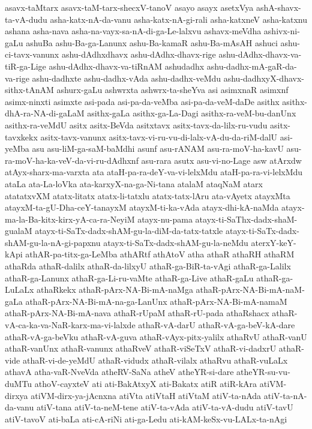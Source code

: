{asavx-taMtarx
asavx-taM-tarx-shecxV-tanoV
asayo
asayx
asetxVya
ashA-shavx-ta-vA-dudu
asha-katx-nA-da-vanu
asha-katx-nA-gi-rali
asha-katxneV
asha-katxnu
ashana
asha-nava
asha-na-vayx-sa-nA-di-ga-Le-lalxvu
ashavx-meVdha
ashivx-ni-gaLu
ashuBa
ashu-Ba-ga-Lanunx
ashu-Ba-kamaR
ashu-Ba-mAsAH
ashuci
ashu-ci-tavx-vanunx
ashu-dAdhxdhavx
ashu-dAdhx-dhavx-rige
ashu-dAdhx-dhavx-va-tiR-ga-Lige
ashu-dAdhx-dhavx-va-tiRnAM
ashudadhx
ashu-dadhx-mA-gaR-da-va-rige
ashu-dadhxte
ashu-dadhx-vAda
ashu-dadhx-veMdu
ashu-dadhxyX-dhavx-sithx-tAnAM
ashurx-gaLu
ashwrxta
ashwrx-ta-sheYva
asi
asimxnaR
asimxnf
asimx-ninxti
asimxte
asi-pada
asi-pa-da-veMba
asi-pa-da-veM-daDe
asithx
asithx-dhA-ra-NA-di-gaLaM
asithx-gaLa
asithx-ga-La-Dagi
asithx-ra-veM-bu-danUnx
asithx-ra-veMdU
asitx
asitx-BeVda
asitxtavx
asitx-tavx-da-lilx-ru-vudu
asitx-tavxkekx
asitx-tavx-vanunx
asitx-tavx-vi-ru-vu-di-lalx-vA-du-da-riM-dalU
asi-yeMba
asu
asu-liM-ga-saM-baMdhi
asunf
asu-rANAM
asu-ra-moV-ha-kavU
asu-ra-moV-ha-ka-veV-da-vi-ru-dAdhxnf
asu-rara
asutx
asu-vi-no-Lage
asw
atArxdw
atAyx-sharx-ma-varxta
ata
ataH-pa-ra-deY-va-vi-lelxMdu
ataH-pa-ra-vi-lelxMdu
ataLa
ata-La-loVka
ata-karxyX-na-ga-Ni-tana
atalaM
ataqNaM
atarx
atatatxvXM
atatx-litatx
atatx-li-tatxlu
atatx-tatx-lAru
ata-vAyetx
atayxMta
atayxM-ta-gU-Dha-ceY-tanayxM
atayxM-ti-ka-vAda
atayx-dhi-kA-naMda
atayx-ma-la-Ba-kitx-kirx-yA-ca-ra-NeyiM
atayx-nu-pama
atayx-ti-SaThx-dadx-shaM-gualaM
atayx-ti-SaTx-dadx-shAM-gu-la-diM-da-tatx-tatxle
atayx-ti-SaTx-dadx-shAM-gu-la-nA-gi-papxnu
atayx-ti-SaTx-dadx-shAM-gu-la-neMdu
aterxY-keY-kApi
athAR-pa-titx-ga-LeMba
athARtf
athAtoV
atha
athaR
athaRH
athaRM
athaRda
athaR-dalilx
athaR-da-lilxyU
athaR-ga-BiR-ta-vAgi
athaR-ga-Lalilx
athaR-ga-Lanunx
athaR-ga-Li-ru-vaMte
athaR-ga-Live
athaR-gaLu
athaR-ga-LuLaLx
athaRkekx
athaR-pArx-NA-Bi-mA-naMga
athaR-pArx-NA-Bi-mA-naM-gaLa
athaR-pArx-NA-Bi-mA-na-ga-LanUnx
athaR-pArx-NA-Bi-mA-namaM
athaR-pArx-NA-Bi-mA-nava
athaR-rUpaM
athaR-rU-pada
athaRshacx
athaR-vA-ca-ka-va-NaR-karx-ma-vi-lalxde
athaR-vA-darU
athaR-vA-ga-beV-kA-dare
athaR-vA-ga-beVku
athaR-vA-guva
athaR-vAyx-pitx-yalilx
athaRvU
athaR-vanU
athaR-vanUnx
athaR-vanunx
athaRveV
athaR-viSeTxV
athaR-vi-dadxrU
athaR-vide
athaR-vi-de-yeMdU
athaR-vidudx
athaR-vilalx
athaRvu
athaR-vuLaLx
athavA
atha-vaR-NveVda
atheRV-SaNa
atheV
atheYR-si-dare
atheYR-su-vu-duMTu
athoV-cayxteV
ati
ati-BakAtxyX
ati-Bakatx
atiR
atiR-kAra
atiVM-dirxya
atiVM-dirx-ya-jAcnxna
atiVta
atiVtaH
atiVtaM
atiV-ta-nAda
atiV-ta-nA-da-vanu
atiV-tana
atiV-ta-neM-tene
atiV-ta-vAda
atiV-ta-vA-dudu
atiV-tavU
atiV-tavoV
ati-baLa
ati-cA-riNi
ati-ga-Ledu
ati-kAM-keSx-vu-LALx-ta-nAgi
}
